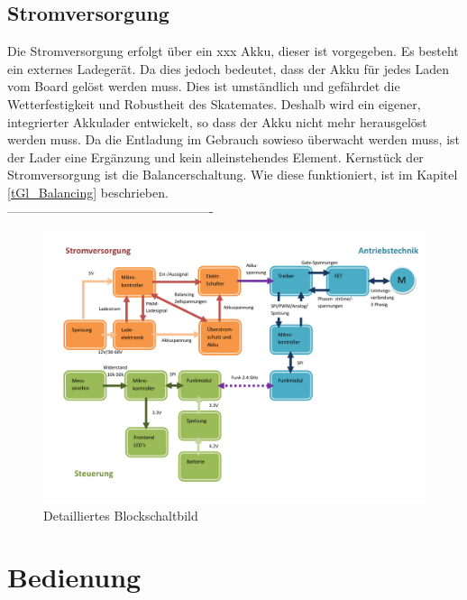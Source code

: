 \subsection*{Stromversorgung}
Die Stromversorgung erfolgt über ein xxx Akku, dieser ist vorgegeben. Es besteht ein externes Ladegerät. Da dies jedoch bedeutet, dass der Akku für jedes Laden vom Board gelöst werden muss. Dies ist umständlich und gefährdet die Wetterfestigkeit und Robustheit des Skatemates. Deshalb wird ein eigener, integrierter Akkulader entwickelt, so dass der Akku nicht mehr herausgelöst werden muss. Da die Entladung im Gebrauch sowieso überwacht werden muss, ist der Lader eine Ergänzung und kein alleinstehendes Element. Kernstück der Stromversorgung ist die Balancerschaltung. Wie diese funktioniert, ist im Kapitel \ref{tGl_Balancing} beschrieben. \\


-------------------------------------------------

\begin{figure}[H]
	\centering
	\includegraphics[width=\linewidth]{images/Grobkonzept_Blockschaltbild_detailliert}
	\caption[Detailliertes Blockschaltbild]{Detailliertes Blockschaltbild}
	\label{fig:grobkonzeptblockschaltbilddetailliert}
\end{figure}




\section{Bedienung}
